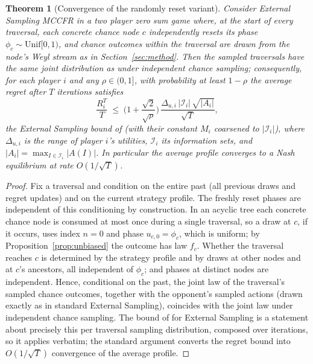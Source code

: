 \documentclass[11pt]{article}
\newtheorem{theorem}{Theorem}
\begin{document}
\begin{theorem}[Convergence of the randomly reset variant]
\label{thm:reset}
Consider External Sampling MCCFR in a two player zero sum game where, at the start of every traversal, each concrete chance node $c$ independently resets its phase $\phi_c\sim\mathrm{Unif}[0,1)$, and chance outcomes within the traversal are drawn from the node's Weyl stream as in Section~\ref{sec:method}. Then the sampled traversals have the same joint distribution as under independent chance sampling; consequently, for each player $i$ and any $\rho\in(0,1]$, with probability at least $1-\rho$ the average regret after $T$ iterations satisfies
\[
\frac{R_i^T}{T} \;\le\; \Big(1+\frac{\sqrt{2}}{\sqrt{\rho}}\Big)\,
\frac{\Delta_{u,i}\,|\mathcal{I}_i|\,\sqrt{|A_i|}}{\sqrt{T}},
\]
the External Sampling bound of \citet{lanctot2009monte} (with their constant $M_i$ coarsened to $|\mathcal{I}_i|$), where $\Delta_{u,i}$ is the range of player $i$'s utilities, $\mathcal{I}_i$ its information sets, and $|A_i|=\max_{I\in\mathcal{I}_i}|A(I)|$. In particular the average profile converges to a Nash equilibrium at rate $O(1/\sqrt{T})$.
\end{theorem}

\begin{proof}
Fix a traversal and condition on the entire past (all previous draws and regret updates) and on the current strategy profile. The freshly reset phases are independent of this conditioning by construction. In an acyclic tree each concrete chance node is consumed at most once during a single traversal, so a draw at $c$, if it occurs, uses index $n=0$ and phase $u_{c,0}=\phi_c$, which is uniform; by Proposition~\ref{prop:unbiased} the outcome has law $f_c$. Whether the traversal reaches $c$ is determined by the strategy profile and by draws at other nodes and at $c$'s ancestors, all independent of $\phi_c$; and phases at distinct nodes are independent. Hence, conditional on the past, the joint law of the traversal's sampled chance outcomes, together with the opponent's sampled actions (drawn exactly as in standard External Sampling), coincides with the joint law under independent chance sampling. The bound of \citet{lanctot2009monte} for External Sampling is a statement about precisely this per traversal sampling distribution, composed over iterations, so it applies verbatim; the standard argument converts the regret bound into $O(1/\sqrt{T})$ convergence of the average profile.
\end{proof}
\end{document}
